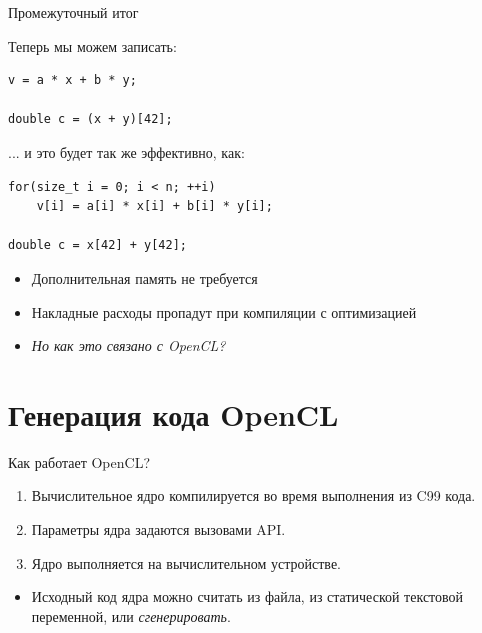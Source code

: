 \documentclass[@BEAMER_OPTIONS@]{beamer}
\newcommand{\CC}{{\rm C99}\xspace}
\begin{document}
\begin{frame}[fragile]{Промежуточный итог}
    \begin{exampleblock}{Теперь мы можем записать:}
        \begin{lstlisting}
v = a * x + b * y;

double c = (x + y)[42];
        \end{lstlisting}
    \end{exampleblock}

    \begin{exampleblock}{... и это будет так же эффективно, как:}
        \begin{lstlisting}
for(size_t i = 0; i < n; ++i)
    v[i] = a[i] * x[i] + b[i] * y[i];

double c = x[42] + y[42];
        \end{lstlisting}
    \end{exampleblock}
    \begin{itemize}
        \item Дополнительная память не требуется
        \item Накладные расходы пропадут при компиляции с оптимизацией
            \vspace{\baselineskip}
            \pause
        \item<alert@2> \emph{Но как это связано с OpenCL?}
    \end{itemize}
\end{frame}


\section{Генерация кода OpenCL}
\begin{frame}
    \sectionpage
\end{frame}

\begin{frame}{Как работает OpenCL?}
    \begin{enumerate}
        \item Вычислительное ядро компилируется во время выполнения из \CC
            кода.
        \item Параметры ядра задаются вызовами API.
        \item Ядро выполняется на вычислительном устройстве.
    \end{enumerate}
    \vspace{\baselineskip}
    \pause
    \begin{itemize}
        \item Исходный код ядра можно считать из файла, из статической
            текстовой переменной, или \alert{\emph{сгенерировать}}.
    \end{itemize}
\end{frame}
\end{document}
